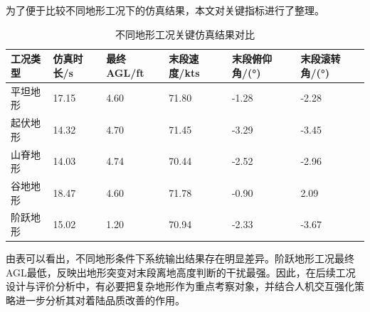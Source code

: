 为了便于比较不同地形工况下的仿真结果，本文对关键指标进行了整理。

\begin{table}[H]
\centering
\caption{不同地形工况关键仿真结果对比}
\begin{tabular}{|l|l|l|l|l|l|}
\hline
\textbf{工况类型} & \textbf{仿真时长/s} & \textbf{最终AGL/ft} & \textbf{末段速度/kts} & \textbf{末段俯仰角/(°)} & \textbf{末段滚转角/(°)} \\
\hline
平坦地形 & 17.15 & 4.60 & 71.80 & -1.28 & -2.28 \\
\hline
起伏地形 & 14.32 & 4.70 & 71.45 & -3.29 & -3.45 \\
\hline
山脊地形 & 14.03 & 4.74 & 70.44 & -2.52 & -2.96 \\
\hline
谷地地形 & 18.47 & 4.60 & 71.78 & -0.90 & 2.09 \\
\hline
阶跃地形 & 15.02 & 1.20 & 70.94 & -2.33 & -3.67 \\
\hline
\end{tabular}
\end{table}

由表可以看出，不同地形条件下系统输出结果存在明显差异。阶跃地形工况最终AGL最低，反映出地形突变对末段离地高度判断的干扰最强。因此，在后续工况设计与评价分析中，有必要把复杂地形作为重点考察对象，并结合人机交互强化策略进一步分析其对着陆品质改善的作用。

